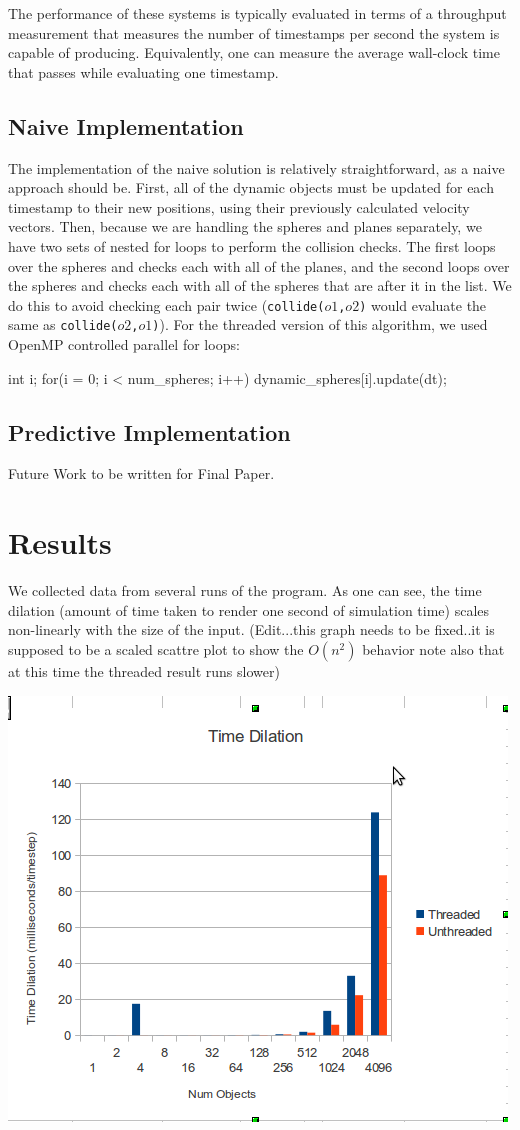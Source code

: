 \documentclass[conference]{IEEEtran}
\begin{document}
The performance of these systems is typically evaluated in terms of a throughput measurement that measures the number of timestamps per second the system is capable of producing.  Equivalently, one can measure the average wall-clock time that passes while evaluating one timestamp.

\subsection{Naive Implementation}

The implementation of the naive solution is relatively straightforward, as a naive approach should be.  First, all of the dynamic objects must be updated for each timestamp to their new positions, using their previously calculated velocity vectors.  Then, because we are handling the spheres and planes separately, we have two sets of nested for loops to perform the collision checks.  The first loops over the spheres and checks each with all of the planes, and the second loops over the spheres and checks each with all of the spheres that are after it in the list.  We do this to avoid checking each pair twice (\texttt{collide($o1$,$o2$)} would evaluate the same as \texttt{collide($o2$,$o1$)}). For the threaded version of this algorithm, we used OpenMP controlled parallel for loops:
\begin{verbatimtab}[3]
	int i;
	for(i = 0; i < num_spheres; i++)
	{
		dynamic_spheres[i].update(dt);
	}
\end{verbatimtab}

\subsection{Predictive Implementation}

Future Work to be written for Final Paper.

\section{Results} %

We collected data from several runs of the program.  As one can see, the time dilation (amount of time taken to render one second of simulation time)
scales non-linearly with the size of the input.  (Edit...this graph needs to be fixed..it is supposed to be a scaled scattre plot to show the $O(n^2)$ behavior note also that at this time the threaded result runs slower)
\begin{center}
	\includegraphics[width=.45\textwidth]{plot.png}
	\label{fig:data}
\end{center}
\end{document}
